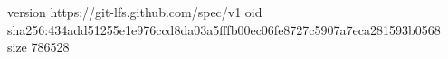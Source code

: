 version https://git-lfs.github.com/spec/v1
oid sha256:434add51255e1e976ccd8da03a5fffb00ec06fe8727c5907a7eca281593b0568
size 786528
